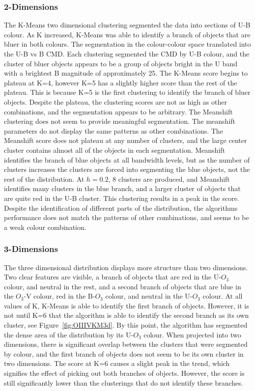 \subsubsection{2-Dimensions}
The K-Means two dimensional clustering segmented the data into sections of U-B colour.
As K increased, K-Means was able to identify a branch of objects that are bluer in both colours.
The segmentation in the colour-colour space translated into the U-B vs B CMD. 
Each clustering segmented the CMD by U-B colour, and the cluster of bluer objects appears to be a group of objects bright in the U band with a brightest B magnitude of approximately 25.
The K-Means score begins to plateau at K=4, however K=5 has a slightly higher score than the rest of the plateau. This is because K=5 is the first clustering to identify the branch of bluer objects.
Despite the plateau, the clustering scores are not as high as other combinations, and the segmentation appears to be arbitrary. 
The Meanshift clustering does not seem to provide meaningful segmentation. The meanshift parameters do not display the same patterns as other combinations. 
The Meanshift score does not plateau at any number of clusters, and the large center cluster contains almost all of the objects in each segmentation.
Meanshift identifies the branch of blue objects at all bandwidth levels, but as the number of clusters increases the clusters are forced into segmenting the blue objects, not the rest of the distribution.
At $h=0.2$, 8 clusters are produced, and Meanshift identifies many clusters in the blue branch, and a larger cluster of objects that are quite red in the U-B cluster.
This clustering results in a peak in the score.
Despite the identification of different parts of the distribution, the algorithms performance does not match the patterns of other combinations, and seems to be a weak colour combination. 

\subsubsection{3-Dimensions}
The three dimensional distribution displays more structure than two dimensions.
Two clear features are visible, a branch of objects that are red in the U-$O_{3}$ colour, and neutral in the rest, and a second branch of objects that are blue in the $O_{3}$-V colour, red in the B-$O_{3}$ colour, and neutral in the U-$O_{3}$ colour.
At all values of K, K-Means is able to identify the first branch of objects. However, it is not until K=6 that the algorithm is able to identify the second branch as its own cluster, see Figure~\ref{fig:OIIIVKM3d}.
By this point, the algorithm has segmented the dense area of the distribution by its U-$O_{3}$ colour.
When projected into two dimensions, there is significant overlap between the clusters that were segmented by colour, and the first branch of objects does not seem to be its own cluster in two dimensions.
The score at K=6 causes a slight peak in the trend, which signifies the effect of picking out both branches of objects. However, the score is still significantly lower than the clusterings that do not identify these branches.

